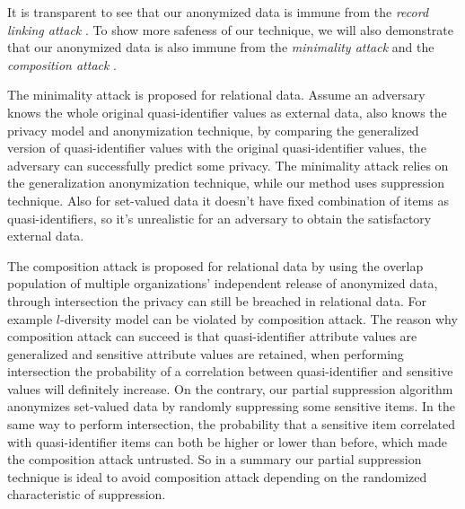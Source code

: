 It is transparent to see that our anonymized data is immune from the {\em
record linking attack} \cite{FungWCY10:Survey}.
To show more safeness of our technique, we will also
demonstrate that our anonymized data is also immune from the {\em minimality
attack} \cite{Wong:2007:Minimality} and the {\em composition attack} \cite{Ganta:2008:Composition}.

The minimality attack \cite{Wong:2007:Minimality}
is proposed for relational data. Assume an adversary knows the whole original
quasi-identifier values as external data, also knows the privacy model and
anonymization technique, by comparing the generalized version of
quasi-identifier values with the original quasi-identifier values, the
adversary can successfully predict some privacy. The minimality attack relies
on the generalization anonymization technique, while our method uses
suppression technique. Also for set-valued data it doesn't have fixed
combination of items as quasi-identifiers, so it's unrealistic for an
adversary to obtain the satisfactory external data. 

The composition attack
\cite{Ganta:2008:Composition} is proposed for relational data by using the
overlap population of multiple organizations' independent release of
anonymized data, through intersection the privacy can still be breached in
relational data. For example $l$-diversity \cite{Ganta:2008:Composition}
model can be violated by composition attack. The reason why composition
attack can succeed is that quasi-identifier attribute values are generalized
and sensitive attribute values are retained, when performing intersection the
probability of a correlation between quasi-identifier and sensitive values
will definitely increase. On the contrary, our partial suppression algorithm
anonymizes set-valued data by randomly suppressing some sensitive items. In
the same way to perform intersection,
 the probability that a sensitive item correlated with quasi-identifier items can
both be higher or lower than before, which made the composition attack
untrusted. So in a summary our partial suppression technique is ideal to
avoid composition attack depending on the randomized characteristic of
suppression.
